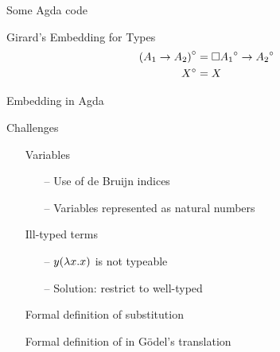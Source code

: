\documentclass{beamer}
\theoremstyle{definition}
\begin{document}
  \begin{frame}{Some Agda code}
    \begin{block}{Girard's Embedding for Types}
      \begin{align*}
        {(A_1 \to A_2)}^\circ     & = \square{{A_1}^\circ} \to {A_2}^\circ      \\                                         
        {X}^\circ                 & = X                                         
      \end{align*}
    \end{block} \pause
    \begin{block}{Embedding in Agda}
      
    \end{block}
  \end{frame}

  \begin{frame}{Challenges}
    \begin{itemize}
      \item[\textbullet] Variables
        \begin{itemize}
          \item[--] Use of \alert{de Bruijn indices}
          \item[--] Variables represented as natural numbers
        \end{itemize} \pause
      \item[\textbullet] Ill-typed terms
        \begin{itemize}
          \item[--] \lterm $y (\lambda {x}.{x})$ is not typeable
          \item[--] Solution: restrict to \alert{well-typed} \lterms
        \end{itemize} \pause
      \item[\textbullet] Formal definition of \alert{substitution}
      \item[\textbullet] Formal definition of \alert{\raiseembn} in Gödel's translation %
    \end{itemize}
  \end{frame}
\end{document}
